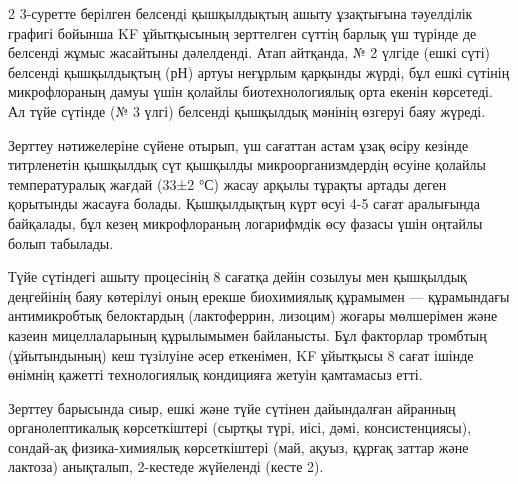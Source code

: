 \begin{multicols}{2}
3-суретте берілген белсенді қышқылдықтың ашыту ұзақтығына тәуелділік
графигі бойынша KF ұйытқысының зерттелген сүттің барлық үш түрінде де
белсенді жұмыс жасайтыны дәлелденді. Атап айтқанда, № 2 үлгіде (ешкі
сүті) белсенді қышқылдықтың (рН) артуы неғұрлым қарқынды жүрді, бұл ешкі
сүтінің микрофлораның дамуы үшін қолайлы биотехнологиялық орта екенін
көрсетеді. Ал түйе сүтінде (№ 3 үлгі) белсенді қышқылдық мәнінің өзгеруі
баяу жүреді.

Зерттеу нәтижелеріне сүйене отырып, үш сағаттан астам ұзақ өсіру кезінде
титрленетін қышқылдық сүт қышқылды микроорганизмдердің өсуіне қолайлы
температуралық жағдай (33±2 °С) жасау арқылы тұрақты артады деген
қорытынды жасауға болады. Қышқылдықтың күрт өсуі 4-5 сағат аралығында
байқалады, бұл кезең микрофлораның логарифмдік өсу фазасы үшін оңтайлы
болып табылады.

Түйе сүтіндегі ашыту процесінің 8 сағатқа дейін созылуы мен қышқылдық
деңгейінің баяу көтерілуі оның ерекше биохимиялық құрамымен ---
құрамындағы антимикробтық белоктардың (лактоферрин, лизоцим) жоғары
мөлшерімен және казеин мицеллаларының құрылымымен байланысты. Бұл
факторлар тромбтың (ұйытындының) кеш түзілуіне әсер еткенімен, KF
ұйытқысы 8 сағат ішінде өнімнің қажетті технологиялық кондицияға жетуін
қамтамасыз етті.

Зерттеу барысында сиыр, ешкі және түйе сүтінен дайындалған айранның
органолептикалық көрсеткіштері (сыртқы түрі, иісі, дәмі,
консистенциясы), сондай-ақ физика-химиялық көрсеткіштері (май, ақуыз,
құрғақ заттар және лактоза) анықталып, 2-кестеде жүйеленді (кесте 2).
\end{multicols}

